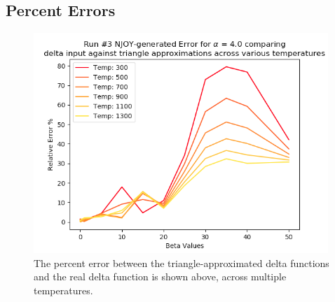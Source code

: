 \documentclass[a4paper]{article}
\begin{document}
\subsection{Percent Errors}
\begin{figure}[H]
\centering
\includegraphics[width=0.99\textwidth]{run3_temperatures_error_alpha_equals_4.png}
\caption{\label{fig:run3_error}The percent error between the triangle-approximated delta functions and the real delta function is shown above, across multiple temperatures. }
\end{figure}



\end{document}
